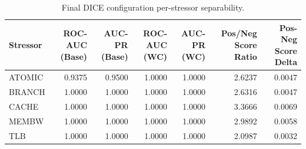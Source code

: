 \begin{table}[t]
\centering
\caption{Final DICE configuration per-stressor separability.}
\label{tab:dice_full_stressor}
\footnotesize
\begin{tabular}{lrrrrrr}
\toprule
Stressor & ROC-AUC (Base) & AUC-PR (Base) & ROC-AUC (WC) & AUC-PR (WC) & Pos/Neg Score Ratio & Pos-Neg Score Delta \\
\midrule
ATOMIC & 0.9375 & 0.9500 & 1.0000 & 1.0000 & 2.6237 & 0.0047 \\
BRANCH & 1.0000 & 1.0000 & 1.0000 & 1.0000 & 2.6316 & 0.0047 \\
CACHE & 1.0000 & 1.0000 & 1.0000 & 1.0000 & 3.3666 & 0.0069 \\
MEMBW & 1.0000 & 1.0000 & 1.0000 & 1.0000 & 2.9892 & 0.0058 \\
TLB & 1.0000 & 1.0000 & 1.0000 & 1.0000 & 2.0987 & 0.0032 \\
\bottomrule
\end{tabular}

\end{table}
